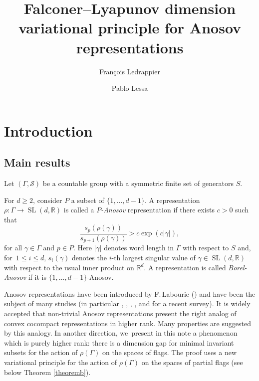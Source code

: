 \documentclass[10pt,a4paper]{amsart}
\newcommand{\R}{\mathbb{R}}
\newcommand{\cS}{\mathcal{S}}
\let\G\Gamma
\let\g\gamma
\DeclareMathOperator{\SL}{SL}
\begin{document}
\title{Falconer--Lyapunov dimension variational principle for Anosov representations}
\author{François Ledrappier\and Pablo Lessa}
\date{}\maketitle
\section{Introduction}

\subsection{Main results}

Let \((\Gamma,\cS)\) be a countable group with a symmetric finite set of generators \(S\).

For \(d \ge 2\), consider \(P\) a subset of \(\lbrace 1,\ldots, d-1\rbrace\).
A representation \(\rho: \Gamma \to \SL(d,\R)\)
is called a {\it{\(P\)-Anosov}} representation if there exists \(c > 0\) such that
\[
\frac{s_{p}(\rho(\gamma))}{s_{p+1}(\rho(\gamma))} > c\exp(c|\gamma|),
\]
for all \(\gamma \in \Gamma\) and \(p \in P\). Here \(|\gamma|\) denotes word length in \(\Gamma\) with respect to \(S\) and, for~\(1\le i\le d, \, s_i(\g)\) denotes the \(i\)-th largest singular value of \(\g \in \SL(d,\R)\) with respect to the usual inner product on \(\R^d\). A representation is called {\it{Borel-Anosov}} if it is \(\lbrace 1,\ldots, d-1\rbrace\)-Anosov.

Anosov representations have been introduced by F.\,Labourie (\cite{Lab06}) and have been the subject of many studies (\cf in particular \cite{GGKW17}, \cite {KLP16}, \cite{KLP17}, \cite{KLP18a}, \cite{BPS19} and \cite{canary} for a recent survey). It is widely accepted that non-trivial Anosov representations present the right analog of convex cocompact representations in higher rank. Many properties are suggested by this analogy. In another direction, we~present in this note a phenomenon which is purely higher rank: there is a dimension gap for minimal invariant subsets for the action of \(\rho (\G) \) on the spaces of flags. The proof uses a new variational principle for the action of \(\rho (\G) \) on the spaces of partial flags (see below Theorem \ref{theoremb}).
\end{document}
